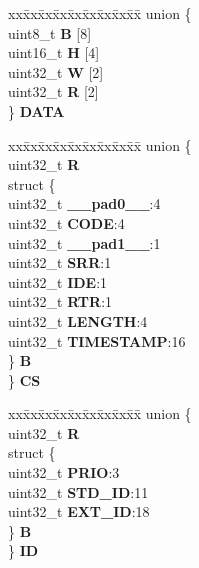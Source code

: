 \begin{DoxyCompactItemize}
\begin{tabbing}
\end{tabbing}\item 
\mbox{\label{structFLEXCAN2__tag_1_1canbuf__t_abc89d76dcd4b75cb982abb4583794dfb}} 
\begin{tabbing}
xx\=xx\=xx\=xx\=xx\=xx\=xx\=xx\=xx\=\kill
union \{\\
\>uint8\_t {\bfseries B} \mbox{[}8\mbox{]}\\
\>uint16\_t {\bfseries H} \mbox{[}4\mbox{]}\\
\>uint32\_t {\bfseries W} \mbox{[}2\mbox{]}\\
\>uint32\_t {\bfseries R} \mbox{[}2\mbox{]}\\
\} {\bfseries DATA}\\

\end{tabbing}\item 
\mbox{\label{structFLEXCAN2__tag_1_1canbuf__t_a1a4c3bda703204a20b947ba4568019e9}} 
\begin{tabbing}
xx\=xx\=xx\=xx\=xx\=xx\=xx\=xx\=xx\=\kill
union \{\\
\>uint32\_t {\bfseries R}\\
\>struct \{\\
\>\>uint32\_t {\bfseries \_\_pad0\_\_}:4\\
\>\>uint32\_t {\bfseries CODE}:4\\
\>\>uint32\_t {\bfseries \_\_pad1\_\_}:1\\
\>\>uint32\_t {\bfseries SRR}:1\\
\>\>uint32\_t {\bfseries IDE}:1\\
\>\>uint32\_t {\bfseries RTR}:1\\
\>\>uint32\_t {\bfseries LENGTH}:4\\
\>\>uint32\_t {\bfseries TIMESTAMP}:16\\
\>\} {\bfseries B}\\
\} {\bfseries CS}\\

\end{tabbing}\item 
\mbox{\label{structFLEXCAN2__tag_1_1canbuf__t_a25ac6e0a21c3c1f8878c25291028d9bd}} 
\begin{tabbing}
xx\=xx\=xx\=xx\=xx\=xx\=xx\=xx\=xx\=\kill
union \{\\
\>uint32\_t {\bfseries R}\\
\>struct \{\\
\>\>uint32\_t {\bfseries PRIO}:3\\
\>\>uint32\_t {\bfseries STD\_ID}:11\\
\>\>uint32\_t {\bfseries EXT\_ID}:18\\
\>\} {\bfseries B}\\
\} {\bfseries ID}\\


\end{tabbing}
\end{DoxyCompactItemize}
